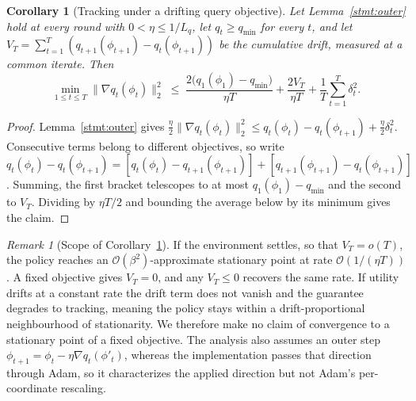 \documentclass[journal]{IEEEtran}
\newtheorem{corollary}{Corollary}
\theoremstyle{remark}
\newtheorem{remark}{Remark}
\newcommand{\revtwo}[1]{#1}
\newcommand{\revtwoeq}{}
\begin{document}
{\begin{corollary}[\revtwo{Tracking under a drifting query objective}]\label{cor:rate}
\revtwo{Let Lemma~\ref{stmt:outer} hold at every round with $0<\eta\le 1/L_q$, let $q_t\ge q_{\min}$ for every $t$, and let $V_T=\sum_{t=1}^{T}(q_{t+1}(\phi_{t+1})-q_t(\phi_{t+1}))$ be the cumulative drift, measured at a common iterate. Then}
\[
\revtwoeq \min_{1\le t\le T}\lVert\nabla q_t(\phi_t)\rVert_2^2\;\le\;
\frac{2\bigl(q_1(\phi_1)-q_{\min}\bigr)}{\eta T}+\frac{2V_T}{\eta T}+\frac{1}{T}\sum_{t=1}^{T}\delta_t^2 .
\]
\end{corollary}
\begin{proof}
\revtwo{Lemma~\ref{stmt:outer} gives $\tfrac{\eta}{2}\lVert\nabla q_t(\phi_t)\rVert_2^2\le q_t(\phi_t)-q_t(\phi_{t+1})+\tfrac{\eta}{2}\delta_t^2$. Consecutive terms belong to different objectives, so write $q_t(\phi_t)-q_t(\phi_{t+1})=[q_t(\phi_t)-q_{t+1}(\phi_{t+1})]+[q_{t+1}(\phi_{t+1})-q_t(\phi_{t+1})]$. Summing, the first bracket telescopes to at most $q_1(\phi_1)-q_{\min}$ and the second to $V_T$. Dividing by $\eta T/2$ and bounding the average below by its minimum gives the claim.}
\end{proof}

\begin{remark}[\revtwo{Scope of Corollary~\ref{cor:rate}}]\label{rem:reading}
\revtwo{If the environment settles, so that $V_T=o(T)$, the policy reaches an $\mathcal{O}(\beta^2)$-approximate stationary point at rate $\mathcal{O}(1/(\eta T))$. A fixed objective gives $V_T=0$, and any $V_T\le 0$ recovers the same rate. If utility drifts at a constant rate the drift term does not vanish and the guarantee degrades to tracking, meaning the policy stays within a drift-proportional neighbourhood of stationarity. We therefore make no claim of convergence to a stationary point of a fixed objective. The analysis also assumes an outer step $\phi_{t+1}=\phi_t-\eta\nabla q_t(\phi'_t)$, whereas the implementation passes that direction through Adam, so it characterizes the applied direction but not Adam's per-coordinate rescaling.}
\end{remark}
\color{black}
}
\end{document}
